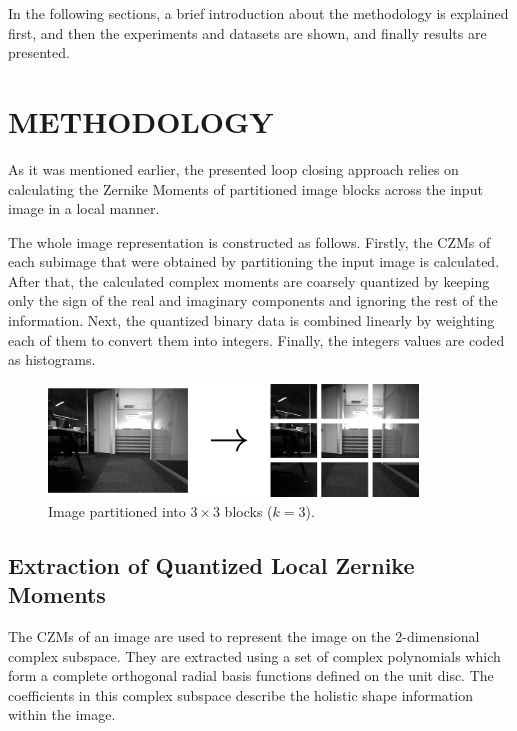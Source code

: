 \documentclass[]{spie}  %
\begin{document}
In the following sections, a brief introduction about the methodology is explained first, and then the experiments and datasets are shown, and finally results are presented. 


\section{METHODOLOGY}
\label{sec:method}

As it was mentioned earlier, the presented loop closing approach relies on calculating the Zernike Moments of partitioned image blocks across the input image in a local manner. 

The whole image representation is constructed as follows. Firstly, the CZMs of each subimage that were obtained by partitioning the input image is calculated. After that, the calculated complex moments are coarsely quantized by keeping only the sign of the real and imaginary components and ignoring the rest of the information. Next, the quantized binary data is combined linearly by weighting each of them to convert them into integers. Finally, the integers values are coded as histograms.

\begin{figure}[!htb]
        \centering
        \includegraphics[trim = 0mm 0mm 0mm 0mm, clip, height=3cm]{figures/divided_image.png}    
        \vspace{3mm}
        \caption{Image partitioned into $3\times 3$ blocks ($k = 3$).}
        \label{fig:divided_image}
\end{figure}

\subsection{Extraction of Quantized Local Zernike Moments} 

The CZMs of an image are used to represent the image on the 2-dimensional complex subspace. They are extracted using a set of complex polynomials which form a complete orthogonal radial basis functions defined on the unit disc. The coefficients in this complex subspace describe the holistic shape information within the image. 
\end{document}
